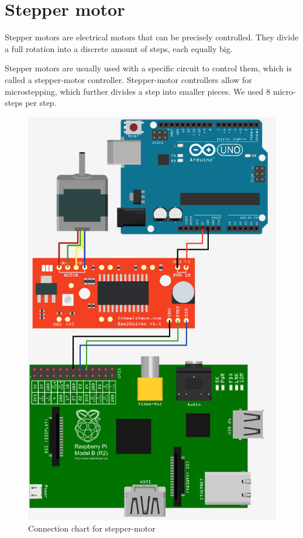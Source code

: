 \clearpage
\section{Stepper motor}
Stepper motors are electrical motors that can be precisely controlled. They divide a full rotation into a discrete amount of steps, each equally big.

Stepper motors are usually used with a specific circuit to control them, which is called a stepper-motor controller. Stepper-motor controllers allow for microstepping, which further divides a step into smaller pieces. We used 8 micro-steps per step.

\begin{figure}[H]
	\centering
	\includegraphics[scale=.5]{images/steppermotor.png}
	\caption{Connection chart for stepper-motor}
	\label{fig:steppermotor}
\end{figure}

